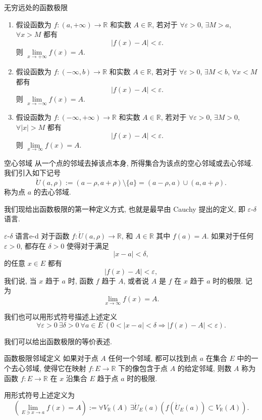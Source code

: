 \documentclass[cn,toc=twocol]{elegantbook}
\newcommand{\ITEMS}{\begin{enumerate}}
\newcommand{\ITEME}{\end{enumerate}}
\newcommand{\R}{\mathbb{R}}
\begin{document}
\begin{definition}{无穷远处的函数极限}
	\ITEMS
		\item 假设函数为 $f : (a,+\infty) \rightarrow \R$ 和实数 $A \in \R$, 若对于 $\forall \varepsilon > 0$, $\exists M > a$, $\forall x > M$ 都有
		\[
			\lvert f(x) - A \rvert < \varepsilon.
		\]
		则 $\lim\limits_{x\to+\infty} f(x) = A$.
		\bigskip
		
		\item 假设函数为 $f : (-\infty,b) \rightarrow \R$ 和实数 $A \in \R$, 若对于 $\forall \varepsilon > 0$, $\exists M < b$, $\forall x < M$ 都有
		\[
			\lvert f(x) - A \rvert < \varepsilon.
		\]
		则 $\lim\limits_{x\to-\infty} f(x) = A$.
		\bigskip
		
		\item 假设函数为 $f : (-\infty,+\infty) \rightarrow \R$ 和实数 $A \in \R$, 若对于 $\forall \varepsilon > 0$, $\exists M > 0$, $\forall \lvert x\rvert > M$ 都有
		\[
			\lvert f(x) - A \rvert < \varepsilon.
		\]
		则 $\lim\limits_{x\to\infty} f(x) = A$.
	
	\ITEME
\end{definition}

\begin{definition}{空心邻域}
从一个点的邻域去掉该点本身, 所得集合为该点的空心邻域或去心邻域. 我们引入如下记号
\[
	\mathring{U}(a,\rho) := (a - \rho, a + \rho)\setminus \{a\}= (a - \rho,a) \cup (a,a + \rho).
\]
称为点 $a$ 的去心邻域.
\end{definition}

我们现给出函数极限的第一种定义方式, 也就是最早由 Cauchy 提出的定义, 即 $\varepsilon$-$\delta$ 语言.

\begin{definition}{$\varepsilon$-$\delta$ 语言}{e-d}
对于函数 $f:\mathring{U}(a,\rho) \rightarrow \R$, 和 $A\in\R$ 其中 $f(a) = A$. 如果对于任何 $\varepsilon > 0$, 都存在 $\delta > 0$ 使得对于满足 
\[
	\lvert x - a \rvert < \delta,
\] 
的任意 $x \in E$ 都有
\[
	\lvert f(x) - A \rvert < \varepsilon,
\] 
我们说, 当 $x$ 趋于 $a$ 时, 函数 $f$ 趋于 $A$, 或者说 $A$ 是 $f$ 在 $x$ 趋于 $a$ 时的极限. 记为
\[
	\lim_{x\to\infty} f(x) = A.
\]

我们也可以用形式符号描述上述定义
\[
	\forall \varepsilon > 0 \ \exists \delta > 0\ \forall a \in E\ (0 < \lvert x - a \rvert < \delta \Rightarrow \lvert f(x) - A \rvert < \varepsilon).
\]
\end{definition}

我们可以给出函数极限的等价表述.
\begin{definition}{函数极限邻域定义}
如果对于点 $A$ 任何一个邻域, 都可以找到点 $a$ 在集合 $E$ 中的一个去心邻域, 使得它在映射 $f: E \to \R$ 下的像包含于点 $A$ 的给定邻域, 则数 $A$ 称为函数 $f: E \to \R$ 在 $x$ 沿集合 $E$ 趋于点 $a$ 时的极限.

用形式符号上述定义为
\[
	\left( \lim_{E \ni x \to a} f(x) = A\right) := \forall V_{\R}(A)\ \exists \mathring{U}_E(a) \left( f\left( \mathring{U}_E(a)\right) \subset V_{\R}(A)\right).
\]
\end{definition}
\end{document}
